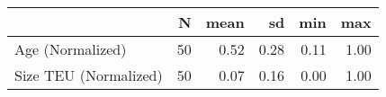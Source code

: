 
\begin{tabular}[t]{lrrrrr}
\toprule
  & N & mean & sd & min & max\\
\midrule
Age (Normalized) & 50 & 0.52 & 0.28 & 0.11 & 1.00\\
Size TEU (Normalized) & 50 & 0.07 & 0.16 & 0.00 & 1.00\\
\bottomrule
\end{tabular}
